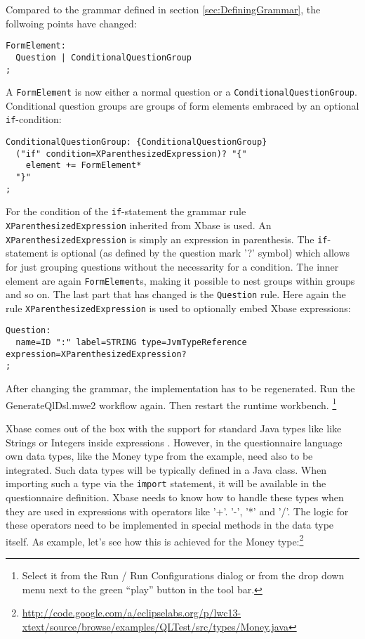 Compared to the grammar defined in section \ref{sec:DefiningGrammar}, the follwoing points have changed:


\begin{lstlisting}[language=Xtext]
FormElement:
  Question | ConditionalQuestionGroup
;
\end{lstlisting}

A \texttt{FormElement} is now either a normal question or a \texttt{ConditionalQuestionGroup}. Conditional
question groups are groups of form elements embraced by an optional \texttt{if}-condition:

\begin{lstlisting}[language=Xtext]
ConditionalQuestionGroup: {ConditionalQuestionGroup}
  ("if" condition=XParenthesizedExpression)? "{"
    element += FormElement*
  "}"
;
\end{lstlisting}

For the condition of the \texttt{if}-statement the grammar rule \texttt{XParenthesizedExpression} 
inherited from Xbase is used. An \texttt{XParenthesizedExpression} is simply an expression in parenthesis.
The \texttt{if}-statement is optional (as defined by the question mark '?' symbol) which allows for just
grouping questions without the necessarity for a condition. The inner element are again \texttt{FormElement}s,
making it possible to nest groups within groups and so on. The last part that has changed is the \texttt{Question}
rule. Here again the rule \texttt{XParenthesizedExpression} is used to optionally embed Xbase expressions:

\begin{lstlisting}[language=Xtext]
Question:
  name=ID ":" label=STRING type=JvmTypeReference expression=XParenthesizedExpression?
;
\end{lstlisting}

After changing the grammar, the implementation has to be regenerated. Run the
GenerateQlDsl.mwe2 workflow again. Then restart the runtime workbench.
\footnote{Select it from the Run / Run Configurations dialog or from the drop
down menu next to the green ``play'' button in the tool bar.}

Xbase comes out of the box with the support for standard Java types like like Strings or Integers inside expressions .
However, in the questionnaire language own data types, like the Money type from the example, need also to be
integrated. Such data types will be typically defined in a Java class. When importing such a type via the \texttt{import}
statement, it will be available in the questionnaire definition. Xbase needs to know how to handle
these types when they are used in expressions with operators like '+'. '-', '*' and '/'. The logic for these
operators need to be implemented in special methods in the data type itself. As example, let's see how this
is achieved for the Money
type:\footnote{\url{http://code.google.com/a/eclipselabs.org/p/lwc13-xtext/source/browse/examples/QLTest/src/types/Money.java}}


